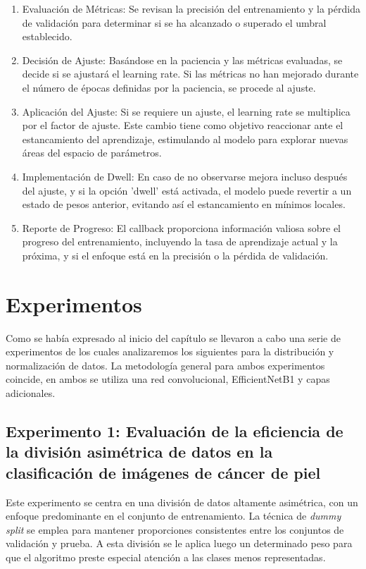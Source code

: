 \begin{enumerate}
   \item Evaluación de Métricas: Se revisan la precisión del entrenamiento y la pérdida de validación para determinar si se ha alcanzado o superado el umbral establecido.
   \item Decisión de Ajuste: Basándose en la paciencia y las métricas evaluadas, se decide si se ajustará el learning rate. Si las métricas no han mejorado durante el número de épocas definidas por la paciencia, se procede al ajuste.
   \item Aplicación del Ajuste: Si se requiere un ajuste, el learning rate se multiplica por el factor de ajuste. Este cambio tiene como objetivo reaccionar ante el estancamiento del aprendizaje, estimulando al modelo para explorar nuevas áreas del espacio de parámetros.
   \item Implementación de Dwell: En caso de no observarse mejora incluso después del ajuste, y si la opción 'dwell' está activada, el modelo puede revertir a un estado de pesos anterior, evitando así el estancamiento en mínimos locales.
   \item Reporte de Progreso: El callback proporciona información valiosa sobre el progreso del entrenamiento, incluyendo la tasa de aprendizaje actual y la próxima, y si el enfoque está en la precisión o la pérdida de validación.
\end{enumerate}

\section{Experimentos}

Como se había expresado al inicio del capítulo se llevaron a cabo una serie de experimentos de los cuales analizaremos los siguientes para la distribución y normalización de datos. La metodología general para ambos experimentos coincide, en ambos se utiliza una red convolucional, EfficientNetB1 y capas adicionales.

\subsection{Experimento 1: Evaluación de la eficiencia de la división asimétrica de datos en la clasificación de imágenes de cáncer de piel}

Este experimento se centra en una división de datos altamente asimétrica, con un enfoque predominante en el conjunto de entrenamiento. La técnica de \textit{dummy split} se emplea para mantener proporciones consistentes entre los conjuntos de validación y prueba. A esta división se le aplica luego un determinado peso para que el algoritmo preste especial atención a las clases menos representadas.

